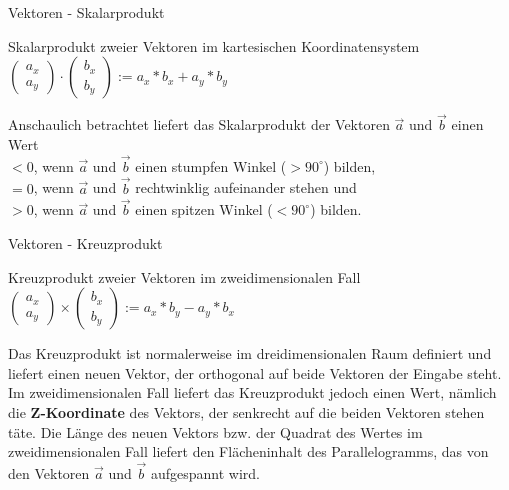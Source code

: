 \begin{frame}{Vektoren - Skalarprodukt}
	\begin{exampleblock}{Skalarprodukt zweier Vektoren im kartesischen Koordinatensystem}
		$\left(\begin{array}{c} a_x \\ a_y \end{array}\right) \cdot \left(\begin{array}{c} b_x \\ b_y \end{array}\right) := a_x * b_x + a_y * b_y$
	\end{exampleblock}
	
	Anschaulich betrachtet liefert das Skalarprodukt der Vektoren $\overrightarrow{a}$ und $\overrightarrow{b}$ einen Wert\\
	$< 0$, wenn $\overrightarrow{a}$ und $\overrightarrow{b}$ einen stumpfen Winkel ($> 90^{\circ}$) bilden,\\
	$= 0$, wenn $\overrightarrow{a}$ und $\overrightarrow{b}$ rechtwinklig aufeinander stehen und\\
	$> 0$, wenn $\overrightarrow{a}$ und $\overrightarrow{b}$ einen spitzen Winkel ($< 90^{\circ}$) bilden.
\end{frame}

\begin{frame}{Vektoren - Kreuzprodukt}
	\begin{exampleblock}{Kreuzprodukt zweier Vektoren im zweidimensionalen Fall}
		$\left(\begin{array}{c} a_x \\ a_y \end{array}\right) \times \left(\begin{array}{c} b_x \\ b_y \end{array}\right) := a_x * b_y - a_y * b_x$
	\end{exampleblock}
	
	Das Kreuzprodukt ist normalerweise im dreidimensionalen Raum definiert und liefert einen neuen Vektor, der orthogonal auf beide Vektoren der Eingabe steht.\\
	Im zweidimensionalen Fall liefert das Kreuzprodukt jedoch einen Wert, nämlich die {\bf Z-Koordinate} des Vektors, der senkrecht auf die beiden Vektoren stehen täte.
	Die Länge des neuen Vektors bzw. der Quadrat des Wertes im zweidimensionalen Fall liefert den Flächeninhalt des Parallelogramms, das von den Vektoren $\overrightarrow{a}$ und $\overrightarrow{b}$ aufgespannt wird.
\end{frame}

